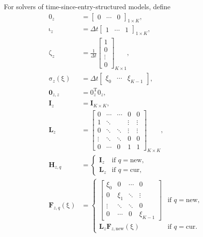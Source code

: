 \documentclass[USenglish]{article}
\renewcommand{\vec}[1]{\boldsymbol{\mathrm{#1}}}
\newcommand{\mat}[1]{\mathbf{#1}}
\begin{document}
For solvers of time-since-entry-structured models, define
\begin{subequations}
  \label{definitions_time_since_entry_structured}
  \begin{align}
    \vec{0}_z &=
    \begin{bmatrix}
      0 & \cdots & 0
    \end{bmatrix}_{1 \times K},
    \\
    \vec{\iota}_z &=
    \Delta t
    \begin{bmatrix}
      1 & \cdots & 1
    \end{bmatrix}_{1 \times K},
    \\
    \vec{\zeta}_z &=
    \frac{1}{\Delta t}
    \begin{bmatrix}
      1 \\ 0 \\ \vdots \\ 0
    \end{bmatrix}_{K \times 1},
    \\
    \vec{\sigma}_z(\vec{\xi}) &=
    \Delta t
    \begin{bmatrix}
      \xi_0 & \cdots & \xi_{K - 1}
    \end{bmatrix},
    \\
    \mat{0}_{z,z} &= \vec{0}_z^{\mathrm{T}} \vec{0}_z,
    \\
    \mat{I}_z &= \mat{I}_{K \times K},
    \\
    \mat{L}_z &=
    \begin{bmatrix}
      0 & \cdots & \cdots & 0 & 0 \\
      1 & \ddots & & \vdots & \vdots \\
      0 & \ddots & \ddots & \vdots & \vdots \\
      \vdots & \ddots & \ddots & 0 & 0 \\
      0 & \cdots & 0 & 1 & 1
    \end{bmatrix}_{K \times K},
    \\
    \mat{H}_{z, q} &=
    \begin{cases}
      \mat{I}_z & \text{if $q = \mathrm{new}$},
      \\
      \mat{L}_z & \text{if $q = \mathrm{cur}$},
    \end{cases}
    \\
    \mat{F}_{z, q}(\vec{\xi}) &=
    \begin{cases}
      \begin{bmatrix}
        \xi_0 & 0 & \cdots & 0 \\
        0 & \xi_1 & \ddots & \vdots \\
        \vdots & \ddots & \ddots & 0 \\
        0 & \cdots & 0 & \xi_{K - 1}
      \end{bmatrix}
      & \text{if $q = \mathrm{new}$},
      \\
      \mat{L}_z \mat{F}_{z, \mathrm{new}}(\vec{\xi})
      & \text{if $q = \mathrm{cur}$}.
    \end{cases}
  \end{align}
\end{subequations}
\end{document}
